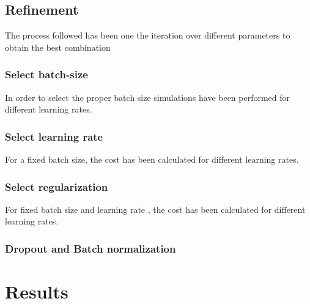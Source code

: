 \documentclass[]{article}
\begin{document}
\pagebreak

\subsection{Refinement}\label{refinement}

The process followed has been one the iteration over different parameters to obtain the best combination
\subsubsection{Select batch-size}
In order to select the proper batch size simulations have been performed for different learning rates.

\subsubsection{Select learning rate}
For a fixed batch size, the cost has been calculated for different learning rates.

\subsubsection{Select regularization}
For fixed batch size and learning rate , the cost has been calculated for different learning rates.

\subsubsection{Dropout and Batch normalization}

\section{Results}\label{iv.-results}
\end{document}
